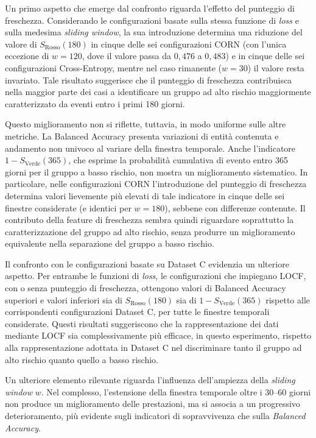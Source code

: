 \documentclass[a4paper,12pt]{report}
\begin{document}
Un primo aspetto che emerge dal confronto riguarda l'effetto del punteggio di freschezza. Considerando le configurazioni basate sulla stessa funzione di \textit{loss} e sulla medesima \textit{sliding window}, la sua introduzione determina una riduzione del valore di \(S_{\text{Rosso}}(180)\) in cinque delle sei configurazioni CORN (con l'unica eccezione di \(w=120\), dove il valore passa da \(0{,}476\) a \(0{,}483\)) e in cinque delle sei configurazioni Cross-Entropy, mentre nel caso rimanente (\(w=30\)) il valore resta invariato. Tale risultato suggerisce che il punteggio di freschezza contribuisca nella maggior parte dei casi a identificare un gruppo ad alto rischio maggiormente caratterizzato da eventi entro i primi 180 giorni.

Questo miglioramento non si riflette, tuttavia, in modo uniforme sulle altre metriche. La Balanced Accuracy presenta variazioni di entità contenuta e andamento non univoco al variare della finestra temporale. Anche l'indicatore \(1-S_{\text{Verde}}(365)\), che esprime la probabilità cumulativa di evento entro 365 giorni per il gruppo a basso rischio, non mostra un miglioramento sistematico. In particolare, nelle configurazioni CORN l'introduzione del punteggio di freschezza determina valori lievemente più elevati di tale indicatore in cinque delle sei finestre considerate (e identici per \(w=180\)), sebbene con differenze contenute. Il contributo della feature di freschezza sembra quindi riguardare soprattutto la caratterizzazione del gruppo ad alto rischio, senza produrre un miglioramento equivalente nella separazione del gruppo a basso rischio.

Il confronto con le configurazioni basate su Dataset C evidenzia un ulteriore aspetto. Per entrambe le funzioni di \textit{loss}, le configurazioni che impiegano LOCF, con o senza punteggio di freschezza, ottengono valori di Balanced Accuracy superiori e valori inferiori sia di \(S_{\text{Rosso}}(180)\) sia di \(1-S_{\text{Verde}}(365)\) rispetto alle corrispondenti configurazioni Dataset C, per tutte le finestre temporali considerate. Questi risultati suggeriscono che la rappresentazione dei dati mediante LOCF sia complessivamente più efficace, in questo esperimento, rispetto alla rappresentazione adottata in Dataset C nel discriminare tanto il gruppo ad alto rischio quanto quello a basso rischio.

Un ulteriore elemento rilevante riguarda l'influenza dell'ampiezza della \textit{sliding window} \(w\). Nel complesso, l'estensione della finestra temporale oltre i 30--60 giorni non produce un miglioramento delle prestazioni, ma si associa a un progressivo deterioramento, più evidente sugli indicatori di sopravvivenza che sulla \textit{Balanced Accuracy}.
\end{document}
